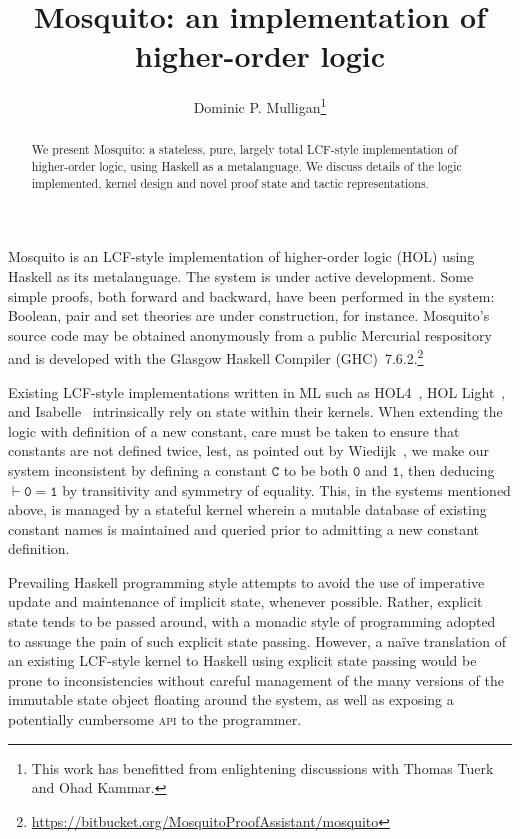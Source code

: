 \documentclass{llncs}
\author{Dominic P. Mulligan\thanks{This work has benefitted from enlightening discussions with Thomas Tuerk and Ohad Kammar.}}
\title{Mosquito: an implementation of higher-order logic}
\institute{Computer Laboratory, University of Cambridge}
\newcommand{\mosquito}{Mosquito\xspace}
\begin{document}
\maketitle

\begin{abstract}
We present \mosquito: a stateless, pure, largely total LCF-style implementation of higher-order logic, using Haskell as a metalanguage.
We discuss details of the logic implemented, kernel design and novel proof state and tactic representations.
\end{abstract}

\mosquito is an LCF-style implementation of higher-order logic (HOL) using Haskell as its metalanguage.
The system is under active development.
Some simple proofs, both forward and backward, have been performed in the system: Boolean, pair and set theories are under construction, for instance.
\mosquito's source code may be obtained anonymously from a public Mercurial respository and is developed with the Glasgow Haskell Compiler (GHC)~7.6.2.\footnote{\url{https://bitbucket.org/MosquitoProofAssistant/mosquito}}

Existing LCF-style implementations written in ML such as HOL4~\cite{gordon:introduction:1993}, HOL Light~\cite{harrison:hol:2009}, and Isabelle~\cite{wenzel:isabelle:2008} intrinsically rely on state within their kernels.
When extending the logic with definition of a new constant, care must be taken to ensure that constants are not defined twice, lest, as pointed out by Wiedijk~\cite{wiedijk:stateless:2011}, we make our system inconsistent by defining a constant $\mathtt{C}$ to be both $\mathtt{0}$ and $\mathtt{1}$, then deducing $\vdash \mathtt{0 = 1}$ by transitivity and symmetry of equality.
This, in the systems mentioned above, is managed by a stateful kernel wherein a mutable database of existing constant names is maintained and queried prior to admitting a new constant definition.

Prevailing Haskell programming style attempts to avoid the use of imperative update and maintenance of implicit state, whenever possible.
Rather, explicit state tends to be passed around, with a monadic style of programming adopted to assuage the pain of such explicit state passing.
However, a na\"ive translation of an existing LCF-style kernel to Haskell using explicit state passing would be prone to inconsistencies without careful management of the many versions of the immutable state object floating around the system, as well as exposing a potentially cumbersome \textsc{api} to the programmer.
\end{document}
